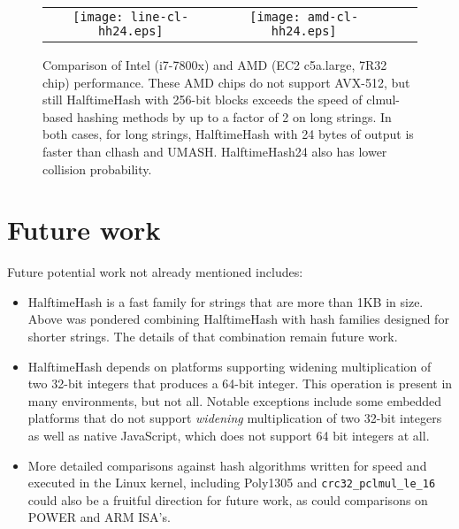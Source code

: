 \documentclass[runningheads]{llncs}
\begin{document}
\begin{figure*}
\begin{tabular}{cccc}
\texttt{[image: line-cl-hh24.eps]}
&
\texttt{[image: amd-cl-hh24.eps]}
\end{tabular}
\caption{
  \label{vs-cl}
  Comparison of Intel (i7-7800x) and AMD (EC2 c5a.large, 7R32 chip) performance.
  These AMD chips do not support AVX-512, but still HalftimeHash with 256-bit blocks exceeds the speed of clmul-based hashing methods by up to a factor of 2 on long strings.
  In both cases, for long strings, HalftimeHash with 24 bytes of output is faster than clhash and UMASH.
  HalftimeHash24 also has lower collision probability.
}
\end{figure*}





\section{Future work}

Future potential work not already mentioned includes:

\begin{itemize}
\item HalftimeHash is a fast family for strings that are more than 1KB in size.
  Above was pondered combining HalftimeHash with hash families designed for shorter strings.
  The details of that combination remain future work.
\item HalftimeHash depends on platforms supporting widening multiplication of two 32-bit integers that produces a 64-bit integer.
  This operation is present in many environments, but not all.
  Notable exceptions include some embedded platforms that do not support {\em widening} multiplication of two 32-bit integers as well as native JavaScript, which does not support 64 bit integers at all.
\item More detailed comparisons against hash algorithms written for speed and executed in the Linux kernel, including Poly1305 and \texttt{crc32\_pclmul\_le\_16} could also be a fruitful direction for future work, as could comparisons on POWER and ARM ISA's.
\end{itemize}
\end{document}
